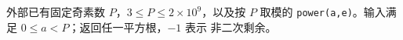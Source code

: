 外部已有固定奇素数 $P$，$3\le P\le 2\times 10^9$，以及按 $P$ 取模的
\texttt{power(a,e)}。输入满足 $0\le a<P$；返回任一平方根，$-1$ 表示
非二次剩余。
